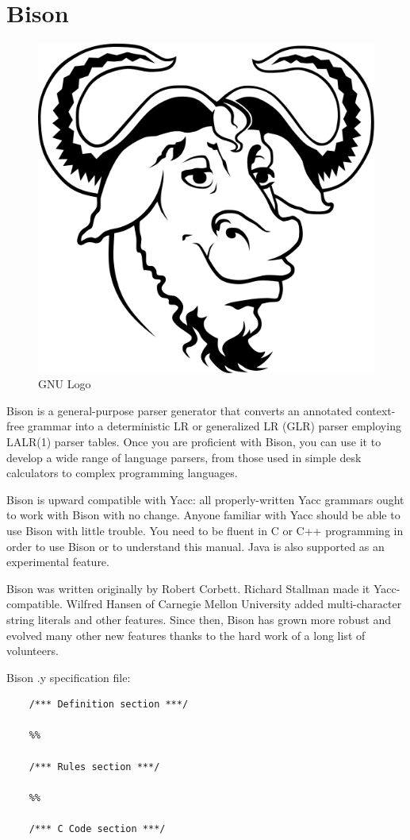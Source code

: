 \section{Bison}

\begin{figure}[h]
	\centering \includegraphics[scale=0.2]{images/gnu.png}
	\caption{GNU Logo}
\end{figure}

Bison is a general-purpose parser generator that converts an annotated context-free grammar into a deterministic LR or generalized LR (GLR) parser employing LALR(1) parser
tables.
Once you are proficient with Bison, you can use it to develop a wide range of language parsers, from those used in simple desk calculators to complex programming languages.


Bison is upward compatible with Yacc: all properly-written Yacc grammars ought to work with Bison with no change. Anyone familiar with Yacc should be able to use Bison with little trouble. You need to be fluent in C or C++ programming in order to use Bison
or to understand this manual. Java is also supported as an experimental feature.


Bison was written originally by Robert Corbett. Richard Stallman made it Yacc-compatible. Wilfred Hansen of Carnegie Mellon University added multi-character string literals and other features. Since then, Bison has grown more robust and evolved many
other new features thanks to the hard work of a long list of volunteers.

Bison .y specification file:

\begin{verbatim}
	/*** Definition section ***/
	
	%%
	
	/*** Rules section ***/
	
	%%
	
	/*** C Code section ***/

\end{verbatim}